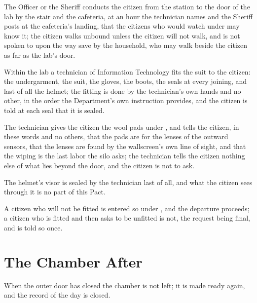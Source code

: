 \begin{clauses}
\item The Officer or the Sheriff conducts the citizen from the station to the door of the lab by the stair and the cafeteria, at an hour the technician names and the Sheriff posts at the cafeteria's landing, that the citizens who would watch under  may know it; the citizen walks unbound unless the citizen will not walk, and is not spoken to upon the way save by the household, who may walk beside the citizen as far as the lab's door.
\item Within the lab a technician of Information Technology fits the suit to the citizen: the undergarment, the suit, the gloves, the boots, the seals at every joining, and last of all the helmet; the fitting is done by the technician's own hands and no other, in the order the Department's own instruction provides, and the citizen is told at each seal that it is sealed.
\item The technician gives the citizen the wool pads under , and tells the citizen, in these words and no others, that the pads are for the lenses of the outward sensors, that the lenses are found by the wallscreen's own line of sight, and that the wiping is the last labor the silo asks; the technician tells the citizen nothing else of what lies beyond the door, and the citizen is not to ask.
\item The helmet's visor is sealed by the technician last of all, and what the citizen sees through it is no part of this Pact.
\item A citizen who will not be fitted is entered so under , and the departure proceeds; a citizen who is fitted and then asks to be unfitted is not, the request being final, and is told so once.
\end{clauses}

\section{The Chamber After}
\label{sec:cleaning:chamber-after}

When the outer door has closed the chamber is not left; it is made ready again, and the record of the day is closed.

